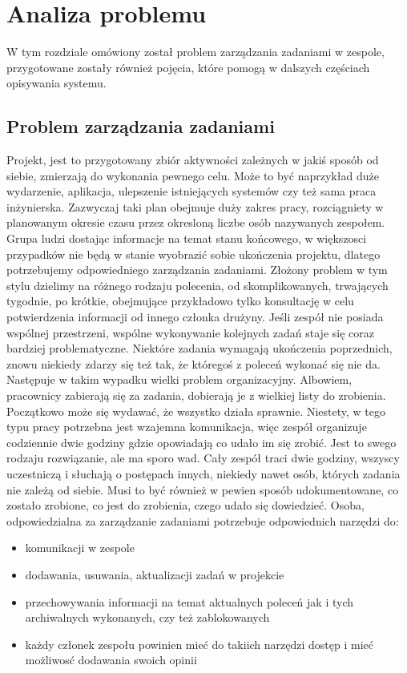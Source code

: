 \chapter{Analiza problemu}
\thispagestyle{chapterBeginStyle}

W tym rozdziale omówiony został problem zarządzania zadaniami w zespole, przygotowane zostały również pojęcia, które pomogą w dalszych częściach opisywania systemu. 
\section{Problem zarządzania zadaniami}

Projekt, jest to przygotowany zbiór aktywności zależnych w jakiś sposób od siebie, zmierzają do wykonania pewnego celu. Może to być naprzykład duże wydarzenie, aplikacja, ulepszenie istniejących systemów czy też sama praca inżynierska. Zazwyczaj taki plan obejmuje duży zakres pracy, rozciągniety w planowanym okresie czasu przez okresloną liczbe osób nazywanych zespołem. Grupa ludzi dostając informacje na temat stanu końcowego, w większosci przypadków nie będą w stanie wyobrazić sobie ukończenia projektu, dlatego potrzebujemy odpowiedniego zarządzania zadaniami. Złożony problem w tym stylu dzielimy na różnego rodzaju polecenia, od skomplikowanych, trwających tygodnie, po krótkie, obejmujące przykładowo tylko konsultację w celu potwierdzenia informacji od innego członka drużyny. Jeśli zespół nie posiada wspólnej przestrzeni, wspólne wykonywanie kolejnych zadań staje się coraz bardziej problematyczne. Niektóre zadania wymagają ukończenia poprzednich, znowu niekiedy zdarzy się też tak, że któregoś z poleceń wykonać się nie da. Następuje w takim wypadku wielki problem organizacyjny. Albowiem, pracownicy zabierają się za zadania, dobierają je z wielkiej listy do zrobienia. Początkowo może się wydawać, że wszystko działa sprawnie. Niestety, w tego typu pracy potrzebna jest wzajemna komunikacja, więc zespół organizuje codziennie dwie godziny gdzie opowiadają co udało im się zrobić. Jest to swego rodzaju rozwiązanie, ale ma sporo wad. Cały zespół traci dwie godziny, wszyscy uczestniczą i słuchają o postępach innych, niekiedy nawet osób, których zadania nie zależą od siebie. Musi to być również w pewien sposób udokumentowane, co zostało zrobione, co jest do zrobienia, czego udało się dowiedzieć. Osoba, odpowiedzialna za zarządzanie zadaniami potrzebuje odpowiednich narzędzi do:
\begin{itemize}
    	\item  komunikacji w zespole
	\item  dodawania, usuwania, aktualizacji zadań w projekcie
	\item  przechowywania informacji na temat aktualnych poleceń jak i tych archiwalnych wykonanych, czy też zablokowanych
	\item każdy członek zespołu powinien mieć do takiich narzędzi dostęp i mieć możliwosć dodawania swoich opinii
\end{itemize}

